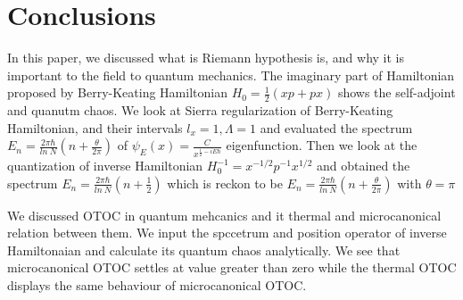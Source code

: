 \documentclass[12pt]{report}
\newcommand*{\1}{\hspace{1pt}}
\begin{document}
        
        
        
        
        
        
        
        \newpage

        \chapter{Conclusions}

        In this paper, we discussed what is Riemann hypothesis is, and why it is important to the field to quantum mechanics. The imaginary part of Hamiltonian proposed by 
        Berry-Keating Hamiltonian $H_{0} = \frac{1}{2}(xp+px)$ shows the self-adjoint and quanutm chaos. We look at Sierra regularization of Berry-Keating Hamiltonian, and 
        their intervals $l_{x}=1, \Lambda=1$ and evaluated the spectrum $E_{n} = \frac{2\pi \hbar}{ln \ N}(n+\frac{\theta}{2\pi})$ of $\psi_{E}(x) = \frac{C}{x^{\frac{1}{2}-iE\hbar}}$
        eigenfunction. Then we look at the quantization of inverse Hamiltonian $H_{0}^{-1} = x^{-1/2}p^{-1}x^{1/2} $ and obtained the spectrum $E_{n} = \frac{2\pi \hbar}{ln \ N}(n+\frac{1}{2})$
        which is reckon to be $E_{n} = \frac{2\pi \hbar}{ln \ N}(n+\frac{\theta}{2\pi})$ with $\theta = \pi$

        We discussed OTOC in quantum mehcanics and it thermal and microcanonical relation between them. We input the spccetrum and position operator of inverse Hamiltonaian 
        and calculate its quantum chaos analytically. We see that microcanonical OTOC settles at value greater than zero while the thermal OTOC displays the same behaviour
        of microcanonical OTOC.
    
    
\end{document}
